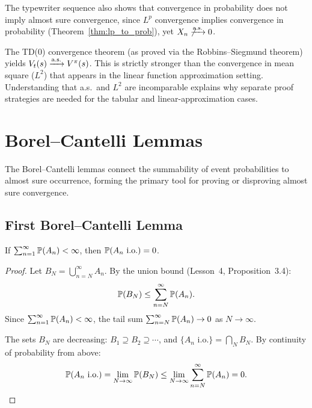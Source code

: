 \documentclass[11pt,a4paper]{article}
\begin{document}
\begin{remark}
\label{rem:prob_not_as}
The typewriter sequence also shows that convergence in probability
does not imply almost sure convergence, since $L^p$ convergence
implies convergence in probability
(Theorem~\ref{thm:lp_to_prob}), yet $X_n \not\xrightarrow{\text{a.s.}} 0$.
\end{remark}

\begin{rlconnection}[title={Convergence Modes in TD Learning}]
The TD(0) convergence theorem (as proved via the Robbins--Siegmund
theorem) yields $V_t(s) \xrightarrow{\text{a.s.}} V^\pi(s)$.  This is strictly stronger
than the convergence in mean square ($L^2$) that appears in the
linear function approximation setting.  Understanding that a.s.\
and $L^2$ are incomparable explains why separate proof strategies
are needed for the tabular and linear-approximation cases.
\end{rlconnection}


\section{Borel--Cantelli Lemmas}
\label{sec:borel_cantelli}

The Borel--Cantelli lemmas connect the summability of event
probabilities to almost sure occurrence, forming the primary tool
for proving or disproving almost sure convergence.

\subsection{First Borel--Cantelli Lemma}
\label{subsec:bc1}

\begin{keyresult}[title={First Borel--Cantelli Lemma}]
\begin{theorem}
\label{thm:bc1}
If $\sum_{n=1}^\infty \mathbb{P}(A_n) < \infty$, then
$\mathbb{P}(A_n \text{ i.o.}) = 0$.
\end{theorem}
\end{keyresult}

\begin{proof}
Let $B_N = \bigcup_{n=N}^\infty A_n$.  By the union bound
(Lesson~4, Proposition~3.4):
\begin{equation}
  \mathbb{P}(B_N) \leq \sum_{n=N}^\infty \mathbb{P}(A_n).
  \label{eq:bc1_step1}
\end{equation}
Since $\sum_{n=1}^\infty \mathbb{P}(A_n) < \infty$, the tail sum
$\sum_{n=N}^\infty \mathbb{P}(A_n) \to 0$ as $N \to \infty$.

The sets $B_N$ are decreasing: $B_1 \supseteq B_2 \supseteq
\cdots$, and $\{A_n \text{ i.o.}\} = \bigcap_N B_N$.  By
continuity of probability from above:
\begin{equation}
  \mathbb{P}(A_n \text{ i.o.})
  = \lim_{N \to \infty} \mathbb{P}(B_N)
  \leq \lim_{N \to \infty} \sum_{n=N}^\infty \mathbb{P}(A_n) = 0.
  \qedhere
\end{equation}
\end{proof}
\end{document}
